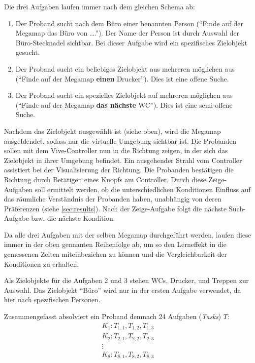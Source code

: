 \documentclass[
    draft=false,
    paper=a4,
    fontsize=12pt,
    twoside=false,
    captions=tableheading,
    british, ngerman,
]{scrartcl}
\begin{document}
Die drei Aufgaben laufen immer nach dem gleichen Schema ab:
\begin{enumerate}
    \item Der Proband sucht nach dem Büro einer benannten Person (\enquote{Finde auf der Megamap das Büro von \dots.}). %
    Der Name der Person ist durch Auswahl der Büro-Stecknadel sichtbar. %
    Bei dieser Aufgabe wird ein spezifisches Zielobjekt gesucht.
    \item Der Proband sucht ein beliebiges Zielobjekt aus mehreren möglichen aus (\enquote{Finde auf der Megamap \textbf{einen} Drucker}). %
    Dies ist eine offene Suche.
    \item Der Proband sucht ein spezielles Zielobjekt auf mehreren möglichen aus (\enquote{Finde auf der Megamap \textbf{das nächste} WC}). %
    Dies ist eine semi-offene Suche.
\end{enumerate}
Nachdem das Zielobjekt ausgewählt ist (siehe oben), wird die Megamap ausgeblendet, sodass nur die virtuelle Umgebung sichtbar ist.
Die Probanden sollen mit dem Vive-Controller nun in die Richtung zeigen, in der sich das Zielobjekt in ihrer Umgebung befindet.
Ein ausgehender Strahl vom Controller assistiert bei der Visualisierung der Richtung.
Die Probanden bestätigen die Richtung durch Betätigen eines Knopfs am Controller.
Durch diese Zeige-Aufgaben soll ermittelt werden, ob die unterschiedlichen Konditionen Einfluss auf das räumliche Verständnis der Probanden haben, unabhängig von deren Präferenzen (siehe \autoref{sec:results}).
Nach der Zeige-Aufgabe folgt die nächste Such-Aufgabe bzw. die nächste Kondition.

Da alle drei Aufgaben mit der selben Megamap durchgeführt werden, laufen diese immer in der oben gennanten Reihenfolge ab, um so den Lerneffekt in die gemessenen Zeiten miteinbeziehen zu können und die Vergleichbarkeit der Konditionen zu erhalten.

Als Zielobjekte für die Aufgaben 2 und 3 stehen WCs, Drucker, und Treppen zur Auswahl.
Das Zielobjekt \enquote{Büro} wird nur in der ersten Aufgabe verwendet, da hier nach spezifischen Personen.

Zusammengefasst absolviert ein Proband demnach 24 Aufgaben (\emph{Tasks}) $T$:
\begin{gather*}
    K_1: T_{1, 1}, T_{1, 2}, T_{1, 3} \\
    K_2: T_{2, 1}, T_{2, 2}, T_{2, 3} \\
    \vdots \\
    K_8: T_{8, 1}, T_{8, 2}, T_{8, 3}
\end{gather*}
\end{document}

